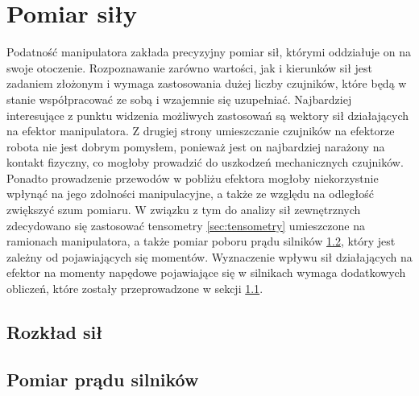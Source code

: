 \documentclass[printmode]{mgr}
\begin{document}
\chapter{Pomiar siły}
Podatność manipulatora zakłada precyzyjny pomiar sił, którymi oddziałuje on na swoje otoczenie. Rozpoznawanie
zarówno wartości, jak i kierunków sił jest zadaniem złożonym i wymaga zastosowania dużej liczby czujników, które
będą w stanie współpracować ze sobą i wzajemnie się uzupełniać. Najbardziej interesujące z punktu widzenia możliwych zastosowań
są wektory sił działających na efektor manipulatora. Z drugiej strony umieszczanie czujników na efektorze robota nie jest dobrym pomysłem,
ponieważ jest on najbardziej narażony na kontakt fizyczny, co mogłoby prowadzić do uszkodzeń mechanicznych czujników. Ponadto
prowadzenie przewodów w pobliżu efektora mogłoby niekorzystnie wpłynąć na jego zdolności manipulacyjne, a także ze względu na odległość zwiększyć
szum pomiaru. W związku z tym do analizy sił zewnętrznych zdecydowano się zastosować tensometry \ref{sec:tensometry} umieszczone na 
ramionach manipulatora, 
a także pomiar poboru prądu silników \ref{sec:pomiar_pradu_silnikow}, który jest zależny od pojawiających się momentów. Wyznaczenie wpływu sił działających
na efektor na momenty napędowe pojawiające się w silnikach wymaga dodatkowych obliczeń, które zostały przeprowadzone w sekcji \ref{sec:rozklad_sil}.

\section{Rozkład sił}\label{sec:rozklad_sil}

\section{Pomiar prądu silników}\label{sec:pomiar_pradu_silnikow}
\end{document}
